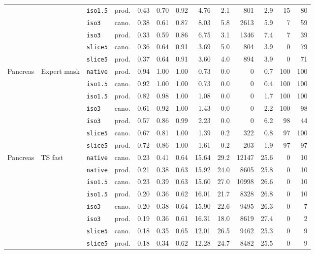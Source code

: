 \begin{tabular}{llllrrrrrrrrr}
 &  & \texttt{iso1.5} & prod. & 0.43 & 0.70 & 0.92 & 4.76 & 2.1 & 801 & 2.9 & 15 & 80 \\
 &  & \texttt{iso3} & cano. & 0.38 & 0.61 & 0.87 & 8.03 & 5.8 & 2613 & 5.9 & 7 & 59 \\
 &  & \texttt{iso3} & prod. & 0.33 & 0.59 & 0.86 & 6.75 & 3.1 & 1346 & 7.4 & 7 & 39 \\
 &  & \texttt{slice5} & cano. & 0.36 & 0.64 & 0.91 & 3.69 & 5.0 & 804 & 3.9 & 0 & 79 \\
 &  & \texttt{slice5} & prod. & 0.37 & 0.64 & 0.91 & 3.60 & 4.0 & 894 & 3.9 & 0 & 71 \\
\midrule
Pancreas & Expert mask & \texttt{native} & prod. & 0.94 & 1.00 & 1.00 & 0.73 & 0.0 & 0 & 0.7 & 100 & 100 \\
 &  & \texttt{iso1.5} & cano. & 0.92 & 1.00 & 1.00 & 0.73 & 0.0 & 0 & 0.4 & 100 & 100 \\
 &  & \texttt{iso1.5} & prod. & 0.82 & 0.98 & 1.00 & 1.08 & 0.0 & 0 & 1.7 & 100 & 100 \\
 &  & \texttt{iso3} & cano. & 0.61 & 0.92 & 1.00 & 1.43 & 0.0 & 0 & 2.2 & 100 & 98 \\
 &  & \texttt{iso3} & prod. & 0.57 & 0.86 & 0.99 & 2.23 & 0.0 & 0 & 6.2 & 98 & 44 \\
 &  & \texttt{slice5} & cano. & 0.67 & 0.81 & 1.00 & 1.39 & 0.2 & 322 & 0.8 & 97 & 100 \\
 &  & \texttt{slice5} & prod. & 0.72 & 0.86 & 1.00 & 1.61 & 0.2 & 203 & 1.9 & 97 & 97 \\
\midrule
Pancreas & TS fast & \texttt{native} & cano. & 0.23 & 0.41 & 0.64 & 15.64 & 29.2 & 12147 & 25.6 & 0 & 10 \\
 &  & \texttt{native} & prod. & 0.21 & 0.38 & 0.63 & 15.92 & 24.0 & 8605 & 25.8 & 0 & 10 \\
 &  & \texttt{iso1.5} & cano. & 0.23 & 0.39 & 0.63 & 15.60 & 27.0 & 10998 & 26.6 & 0 & 10 \\
 &  & \texttt{iso1.5} & prod. & 0.20 & 0.36 & 0.62 & 16.01 & 21.7 & 8328 & 26.8 & 0 & 10 \\
 &  & \texttt{iso3} & cano. & 0.20 & 0.38 & 0.64 & 15.90 & 22.6 & 9495 & 26.3 & 0 & 7 \\
 &  & \texttt{iso3} & prod. & 0.19 & 0.36 & 0.61 & 16.31 & 18.0 & 8619 & 27.4 & 0 & 2 \\
 &  & \texttt{slice5} & cano. & 0.18 & 0.35 & 0.65 & 12.01 & 26.5 & 9462 & 25.3 & 0 & 9 \\
 &  & \texttt{slice5} & prod. & 0.18 & 0.34 & 0.62 & 12.28 & 24.7 & 8482 & 25.5 & 0 & 9 \\

\end{tabular}
